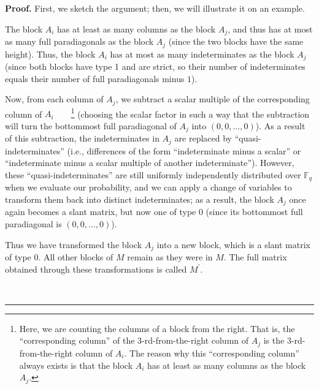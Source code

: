 \documentclass[numbers=enddot,12pt,final,onecolumn,notitlepage]{scrartcl}%
\theoremstyle{definition}
\newenvironment{proof}[1][Proof]{\noindent\textbf{#1.} }{\ \rule{0.5em}{0.5em}}
\newcommand{\Fq}{\mathbb{F}_q}
\theoremstyle{plainsl}
\begin{document}
\begin{proof}
First, we sketch the argument; then, we will illustrate it on an example.

The block $A_{i}$ has at least as many columns as the block $A_{j}$, and thus
has at most as many full paradiagonals as the block $A_{j}$ (since the two
blocks have the same height). Thus, the block $A_{i}$ has at most as many
indeterminates as the block $A_{j}$ (since both blocks have type 1 and
are strict, so their
number of indeterminates equals their number of full paradiagonals minus $1$).

Now, from each column of $A_{j}$, we subtract a scalar multiple of the
corresponding column of $A_{i}$\ \ \ \ \footnote{Here, we are counting the
columns of a block from the right. That is, the ``corresponding column'' of
the $3$-rd-from-the-right column of $A_{j}$ is the $3$-rd-from-the-right
column of $A_{i}$.
The reason why this ``corresponding column'' always exists is that the block
$A_{i}$ has at least as many columns as the block $A_{j}$.} (choosing the
scalar factor in such a way that the subtraction will turn the bottommost full
paradiagonal of $A_{j}$ into $\left(  0,0,\ldots,0\right)  $). As a result of
this subtraction, the indeterminates in $A_{j}$ are replaced by
``quasi-indeterminates'' (i.e., differences of the form ``indeterminate minus
a scalar'' or ``indeterminate minus a scalar multiple of another
indeterminate''). However, these ``quasi-indeterminates'' are still uniformly
independently distributed over $\Fq$ when we evaluate our
probability, and we can apply a change of variables to transform them back
into distinct indeterminates; as a result, the block $A_{j}$ once again
becomes a slant matrix, but now one of type 0 (since its bottommost full
paradiagonal is $\left(  0,0,\ldots,0\right)  $).

Thus we have transformed the block $A_j$ into a new block, which is a slant
matrix of type 0. All other blocks of $M$ remain as they were in $M$.
The full matrix obtained through these transformations is called
$M^{\prime}$.


\end{proof}
\end{document}
